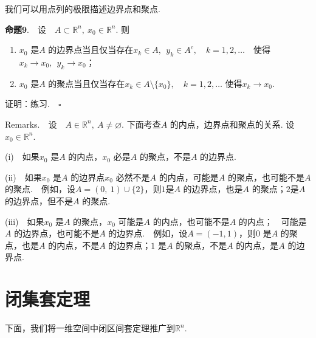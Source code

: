 \documentclass{article}
\begin{document}
\vspace{20pt}

\noindent 我们可以用点列的极限描述边界点和聚点.

\vspace{20pt}

\noindent \textbf{命题9}.\ \ 设\ \ \(A \subset \mathbb{R}^n,\ x_0 \in \mathbb{R}^n\). 则
\begin{enumerate}
    \item \(x_0\) 是\(A\) 的边界点当且仅当存在\(x_k \in A,\ \ y_k \in A^c,\quad k = 1,2,\dots \)\ \ 使得\(x_k \to x_0,\ \ y_k \to x_0\)；
    \item \(x_0\) 是\(A\) 的聚点当且仅当存在\(x_k \in A\setminus \{x_0\},\quad k = 1,2,\dots \) 使得\(x_k \to x_0\).
\end{enumerate}

\vspace{20pt}

\noindent 证明：练习.\(\quad \square\)

\newpage

\noindent Remarks.\ \ 设\ \ \(A \in \mathbb{R}^n,\ A \neq \varnothing \). 下面考查\(A\) 的内点，边界点和聚点的关系. 设\(x_0 \in \mathbb{R}^n\).

\vspace{20pt}

\noindent (i)\ \ 如果\(x_0\) 是\(A\) 的内点，\(x_0\) 必是\(A\) 的聚点，不是\(A\) 的边界点.

\vspace{20pt}

\noindent (ii)\ \ 如果\(x_0\) 是\(A\) 的边界点\(x_0\) 必然不是\(A\) 的内点，可能是\(A\) 的聚点，也可能不是\(A\) 的聚点.\ \ 例如，设\(A =(0,\ 1)\cup \{2\} \)，则\(1\)是\(A\) 的边界点，也是\(A\) 的聚点；\(2\)是\(A\) 的边界点，但不是\(A\) 的聚点.

\vspace{20pt}

\noindent (iii)\ \ 如果\(x_0\) 是\(A\) 的聚点，\(x_0\) 可能是\(A\) 的内点，也可能不是\(A\) 的内点；\ \ 可能是\(A\) 的边界点，也可能不是\(A\) 的边界点.\ \ 例如，设\(A =( - 1,1)\)，则\(0\) 是\(A\) 的聚点，也是\(A\) 的内点，不是\(A\) 的边界点；\(1\) 是\(A\) 的聚点，不是\(A\) 的内点，是\(A\) 的边界点.

\newpage

\section{闭集套定理}

\noindent 下面，我们将一维空间中闭区间套定理推广到\(\mathbb{R}^n\).
\end{document}
